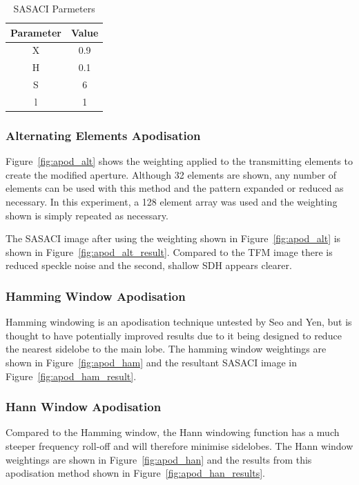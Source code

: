\begin{table}[htbp!]
\begin{center}
	\begin{tabular}{| c | c |}
	\hline 
	\textbf{Parameter} & \textbf{Value} \\ \hline \hline 
	X	&  0.9 \\ \hline
	H & 0.1 \\ \hline
	S & 6 \\ \hline
	l & 1 \\ \hline
	\end{tabular}
	\caption{SASACI Parmeters}
	\label{table:sasaci_params}
	\end{center}
	\end{table}
	
\subsubsection{Alternating Elements Apodisation}
Figure~\ref{fig:apod_alt} shows the weighting applied to the transmitting elements to create the modified aperture. Although 32 elements are shown, any number of elements can be used with this method and the pattern expanded or reduced as necessary. In this experiment, a 128 element array was used and the weighting shown is simply repeated as necessary.

The SASACI image after using the weighting shown in Figure~\ref{fig:apod_alt} is shown in Figure~\ref{fig:apod_alt_result}. Compared to the TFM image there is reduced speckle noise and the second, shallow SDH appears clearer.

\subsubsection{Hamming Window Apodisation}
Hamming windowing is an apodisation technique untested by Seo and Yen, but is thought to have potentially improved results due to it being designed to reduce the nearest sidelobe to the main lobe. The hamming window weightings are shown in Figure~\ref{fig:apod_ham} and the resultant SASACI image in Figure~\ref{fig:apod_ham_result}.

\subsubsection{Hann Window Apodisation}
Compared to the Hamming window, the Hann windowing function has a much steeper frequency roll-off and will therefore minimise sidelobes. The Hann window weightings are shown in Figure~\ref{fig:apod_han} and the results from this apodisation method shown in Figure~\ref{fig:apod_han_results}.

